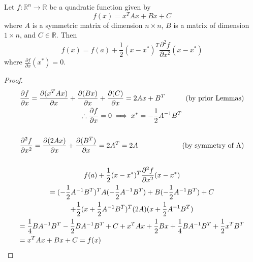 \begin{lemma} \label{lemmaTaylorDecomp}
Let \(f: \mathbb{R}^n \to \mathbb{R}\) be a quadratic function given by \[f(x) = x^T Ax + Bx + C\]
where \(A\) is a symmetric matrix of dimension \(n \times n\), \(B\) is a matrix of dimension \(1 \times n\), and \(C \in \mathbb{R}\). Then \[
f(x) = f(a) + \frac{1}{2} (x-x^*)^T \frac{\partial^2 f}{\partial x^2} (x-x^*)
\] where \(\frac{\partial f}{\partial x}(x^*) = 0\). 


\end{lemma}
\begin{proof}
\begin{multline*}
\frac{\partial f}{\partial x} = \frac{\partial (x^T A x)}{\partial x} + \frac{\partial (B x)}{\partial x} + \frac{\partial (C)}{\partial x} = 2Ax + B^T \hfill \text{(by prior Lemmas)} \\
\therefore \frac{\partial f}{\partial x} = 0 \implies x^* = -\frac{1}{2} A^{-1} B^T \\ \\
\frac{\partial^2 f}{\partial x^2} = \frac{\partial (2Ax)}{\partial x} + \frac{\partial (B^T)}{\partial x} = 2A^T = 2A \hfill \text{(by symmetry of A)} \\ \\
f(a) + \frac{1}{2} (x-x^*)^T \frac{\partial^2 f}{\partial x^2} (x-x^*) \\
= (-\frac{1}{2}A^{-1}B^T)^T A (-\frac{1}{2}A^{-1}B^T) + B(-\frac{1}{2}A^{-1}B^T) + C \\
+ \frac{1}{2}(x +\frac{1}{2}A^{-1}B^T)^T (2A) (x +\frac{1}{2}A^{-1}B^T) \\
= \frac{1}{4} B A^{-1} B^T - \frac{1}{2} B A^{-1} B^T + C + x^T A x + \frac{1}{2}Bx + \frac{1}{4} BA^{-1}B^T + \frac{1}{2}x^TB^T \\
= x^TAx + Bx + C = f(x) \hfill
\end{multline*}
\end{proof}

